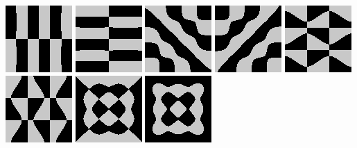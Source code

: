 \includegraphics{o/dchladni_025.png}
\includegraphics{o/dchladni_026.png}
\includegraphics{o/dchladni_027.png}
\includegraphics{o/dchladni_028.png}
\includegraphics{o/dchladni_029.png}
\includegraphics{o/dchladni_030.png}
\includegraphics{o/dchladni_031.png}
\includegraphics{o/dchladni_032.png}

